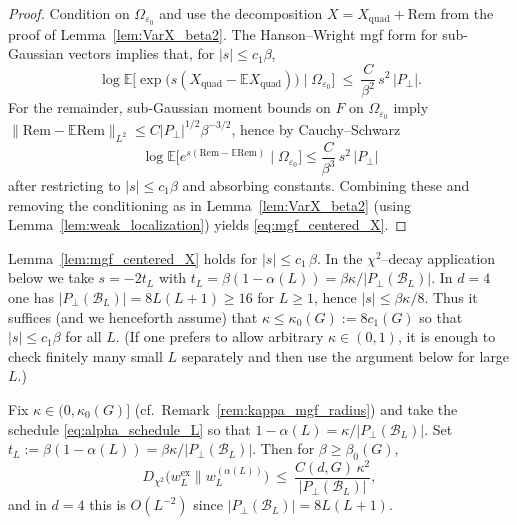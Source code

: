 \begin{proof}
Condition on $\Omega_{\varepsilon_0}$ and use the decomposition $X=X_{\mathrm{quad}}+\mathrm{Rem}$ from the proof of Lemma~\ref{lem:VarX_beta2}.
The Hanson--Wright mgf form for sub-Gaussian vectors implies that, for $|s|\le c_1\beta$,
\[
\log \mathbb E\!\big[\exp\big(s(X_{\mathrm{quad}}-\mathbb E X_{\mathrm{quad}})\big)\mid\Omega_{\varepsilon_0}\big]
\ \le\ \frac{C}{\beta^2}\,s^2\,|P_\perp|.
\]
For the remainder, sub-Gaussian moment bounds on $F$ on $\Omega_{\varepsilon_0}$ imply $\|\mathrm{Rem}-\mathbb E\mathrm{Rem}\|_{L^2}\le
C|P_\perp|^{1/2}\beta^{-3/2}$, hence by Cauchy--Schwarz
\[
\log \mathbb E\!\big[e^{s(\mathrm{Rem}-\mathbb E\mathrm{Rem})}\mid\Omega_{\varepsilon_0}\big]
\le \frac{C}{\beta^3}\,s^2\,|P_\perp|
\]
after restricting to $|s|\le c_1\beta$ and absorbing constants.
Combining these and removing the conditioning as in Lemma~\ref{lem:VarX_beta2} (using Lemma~\ref{lem:weak_localization}) yields
\eqref{eq:mgf_centered_X}.
\end{proof}


\begin{remark}\label{rem:kappa_mgf_radius}
Lemma~\ref{lem:mgf_centered_X} holds for $|s|\le c_1\,\beta$.
In the $\chi^2$--decay application below we take $s=-2t_L$ with $t_L=\beta(1-\alpha(L))=\beta\kappa/|P_\perp(\mathcal B_L)|$.
In $d=4$ one has $|P_\perp(\mathcal B_L)|=8L(L+1)\ge 16$ for $L\ge 1$, hence $|s|\le \beta\kappa/8$.
Thus it suffices (and we henceforth assume) that $\kappa\le \kappa_0(G):=8c_1(G)$ so that $|s|\le c_1\beta$ for all $L$.
(If one prefers to allow arbitrary $\kappa\in(0,1)$, it is enough to check finitely many small $L$ separately and then use the argument below for large $L$.)
\end{remark}



\begin{proposition}\label{prop:chi2_decay_alpha_schedule}
Fix $\kappa\in(0,\kappa_0(G)]$ (cf.\ Remark~\ref{rem:kappa_mgf_radius}) and take the schedule \eqref{eq:alpha_schedule_L} so that $1-\alpha(L)=\kappa/|P_\perp(\mathcal B_L)|$.
Set $t_L:=\beta(1-\alpha(L))=\beta\kappa/|P_\perp(\mathcal B_L)|$.
Then for $\beta\ge\beta_0(G)$,
\begin{equation}\label{eq:chi2_decay_alpha_v2}
D_{\chi^2}\!\bigl(w_L^{\mathrm{ex}}\|w_L^{(\alpha(L))}\bigr)
\ \le\ \frac{C(d,G)\,\kappa^2}{|P_\perp(\mathcal B_L)|},
\end{equation}
and in $d=4$ this is $O(L^{-2})$ since $|P_\perp(\mathcal B_L)|=8L(L+1)$.
\end{proposition}

